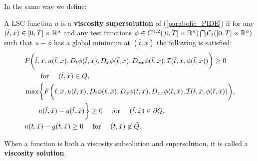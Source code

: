 In the same way we define:
\begin{Definition}
 A LSC function $u$ is a \textbf{viscosity supersolution} of (\ref{parabolic_PIDE})
 if for any $(\bar t, \bar x) \in [0,T]\times \mathbb{R}^n$ and any test functions $ \phi \in C^{1,2}([0,T] \times \mathbb{R}^n) \bigcap \mathcal{C}_2([0,T] \times \mathbb{R}^n)$ 
 such that $u-\phi$ has a global minimum at $(\bar t,\bar x)$ the following is satisfied:
\begin{align}\label{supersolution}
 & F\biggl( \bar t,\bar x,u(\bar t,\bar x),D_t \phi(\bar t,\bar x), D_x \phi(\bar t,\bar x),D_{xx}\phi(\bar t,\bar x),\mathcal{I}(\bar t, \bar x,\phi(\bar t,\bar x))\biggr) \geq 0 \\ \nonumber
 &  \quad \quad \mbox{ for } \quad (\bar t,\bar x) \in Q, \\ \nonumber
 & \max \biggl\{ F \biggl( \bar t,\bar x,u(\bar t,\bar x), D_t \phi(\bar t,\bar x), D_x \phi(\bar t,\bar x), 
 D_{xx}\phi(\bar t,\bar x),\mathcal{I}(\bar t, \bar x,\phi(\bar t,\bar x)) \biggr) ,\\ \nonumber 
 & \quad \quad u(\bar t,\bar x) - g(\bar t,\bar x) \biggr\} \geq 0  \quad  \mbox{ for } \quad (\bar t,\bar x) \in \partial Q, \\ \nonumber
 & u(\bar t,\bar x) - g(\bar t,\bar x) \geq 0  \quad  \mbox{ for } \quad (\bar t,\bar x) \not \in \bar Q.
\end{align}
\end{Definition}

When a function is both a viscosity subsolution and supersolution, it is called a \textbf{viscosity solution}.


